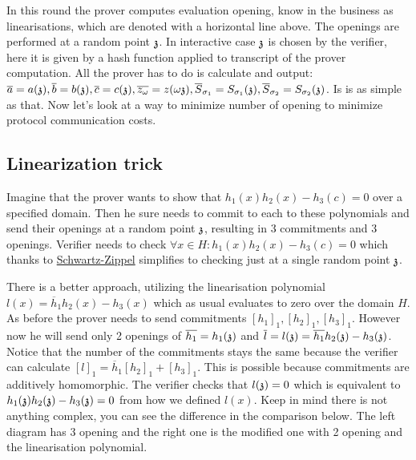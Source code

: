 In this round the prover computes evaluation opening, know in the business as linearisations, which are denoted with a horizontal line above. The openings are performed at a random point $\mathfrak{z}$. In interactive case $\mathfrak{z}$ is chosen by the verifier, here it is given by a hash function applied to transcript of the prover computation. All the prover has to do is calculate and output: $\overline{a} = a(\mathfrak{z}), \overline{b} = b(\mathfrak{z}), \overline{c} = c(\mathfrak{z}), \overline{z_\omega} = z(\omega\mathfrak{z}),\overline{S}_{\sigma_1} = S_{\sigma_1}(\mathfrak{z}), \overline{S}_{\sigma_2} = S_{\sigma_2}(\mathfrak{z})$. Is is as simple as that. Now let's look at a way to minimize number of opening to minimize protocol communication costs.

\subsection{Linearization trick}
Imagine that the prover wants to show that $h_1(x)h_2(x) - h_3(c) = 0$ over a specified domain. Then he sure needs to commit to each to these polynomials and send their openings at a random point $\mathfrak{z}$, resulting in 3 commitments and 3 openings. Verifier needs to check $\forall x \in H: h_1(x)h_2(x) - h_3(c) = 0$ which thanks to \href{https://en.wikipedia.org/wiki/Schwartz%E2%80%93Zippel_lemma}{Schwartz-Zippel} simplifies to checking just at a single random point $\mathfrak{z}$. 

There is a better approach, utilizing the linearisation polynomial $l(x) = \overline{h}_1 h_2(x) - h_3(x)$ which as usual evaluates to zero over the domain $H$. As before the prover needs to send commitments $[h_1]_1, [h_2]_1, [h_3]_1$. However now he will send only 2 openings of $\overline{h_1} = h_1(\mathfrak{z})$ and $\overline{l} = l(\mathfrak{z}) = \overline{h_1}h_2(\mathfrak{z}) - h_3(\mathfrak{z})$. Notice that the number of the commitments stays the same because the verifier can calculate $[l]_1 = \overline{h}_1[h_2]_1 + [h_3]_1$. This is possible because commitments are additively homomorphic. The verifier checks that $l(\mathfrak{z}) = 0$ which is equivalent to $h_1(\mathfrak{z})h_2(\mathfrak{z}) - h_3(\mathfrak{z}) = 0$ from how we defined $l(x)$. Keep in mind there is not anything complex, you can see the difference in the comparison below. The left diagram has 3 opening and the right one is the modified one with 2 opening and the linearisation polynomial.

